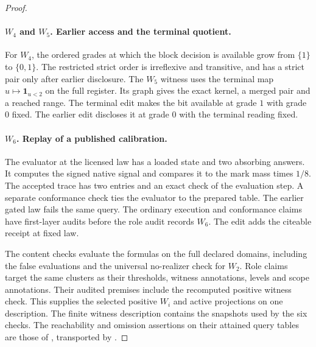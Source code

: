 \begin{proof}
\paragraph{\(W_4\) and \(W_5\). Earlier access and the terminal quotient.}
For \(W_4\), the ordered grades at which the block decision is
available grow from \(\{1\}\) to \(\{0,1\}\). The restricted strict
order is irreflexive and transitive, and has a strict pair only
after earlier disclosure.
The \(W_5\) witness uses the terminal map \(u\mapsto\mathbf 1_{u<2}\)
on the full register. Its graph gives the exact kernel, a merged
pair and a reached range. The terminal edit makes the bit
available at grade \(1\) with grade \(0\) fixed. The earlier edit
discloses it at grade \(0\) with the terminal reading fixed.

\paragraph{\(W_6\). Replay of a published calibration.}
The evaluator at the licensed law has a loaded state and
two absorbing answers. It computes the signed native signal
and compares it to the mark mass times \(1/8\). The accepted
trace has two entries and an exact check of the evaluation
step. A separate conformance check ties the evaluator to the
prepared table. The earlier gated law fails the same query.
The ordinary execution and conformance claims have first-layer
audits before the role audit records \(W_6\).
The edit adds the citeable receipt at fixed law.

The content checks evaluate the formulas on the full declared
domains, including the false evaluations and the universal
no-realizer check for \(W_2\). Role claims target the same
clusters as their thresholds, witness annotations, levels and
scope annotations. Their audited premises include the
recomputed positive witness check. This supplies the selected
positive \(W_i\) and active projections on one description.
The finite witness description contains the snapshots used by
the six checks. The reachability and omission assertions on their
attained query tables are those of , transported
by .
\end{proof}
